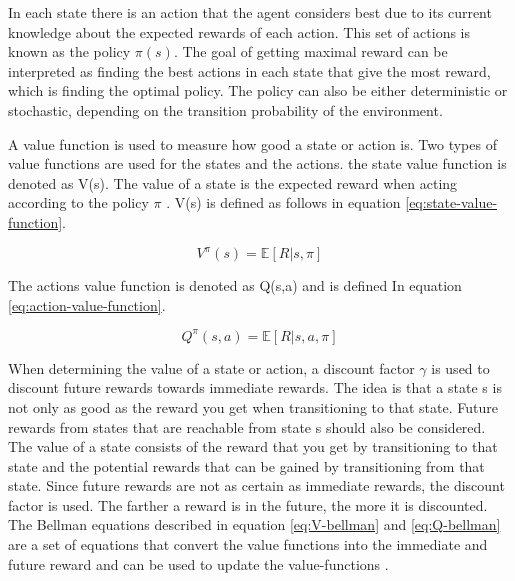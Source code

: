 \vspace{0.5cm}

In each state there is an action that the agent considers best due to its current knowledge about the expected rewards of each action. This set of actions is known as the policy 
$\pi (s)$. 
The goal of getting maximal reward can be interpreted as finding the best actions in each state that give the most reward, which is finding the optimal policy. The policy can also be either deterministic or stochastic, depending on the transition probability of the environment.

\vspace{0.5cm}

A value function is used to measure how good a state or action is. Two types of value functions are used for the states and the actions. the state value function is denoted as V(s). The value of a state is the expected reward when acting according to the policy 
$\pi$ \cite{rlwiki}.
V(s) is defined as follows in equation \ref{eq:state-value-function}.

\begin{equation}
\label{eq:state-value-function}
V^\pi (s) = \mathbb{E} [R | s,\pi]
\end{equation}

The actions value function is denoted as Q(s,a) and is defined In equation \ref{eq:action-value-function}.

\begin{equation}
\label{eq:action-value-function}
Q^\pi (s,a) = \mathbb{E} [R | s,a,\pi]
\end{equation}

When determining the value of a state or action, a discount factor $\gamma$
is used to discount future rewards towards immediate rewards. 
The idea is that a state s is not only as good as the reward you get when transitioning to that state. Future rewards from states that are reachable from state s should also be considered. The value of a state consists of the reward that you get by transitioning to that state and the potential rewards that can be gained by transitioning from that state. 
Since future rewards are not as certain as immediate rewards, the discount factor is used. The farther a reward is in the future, the more it is discounted. 
The Bellman equations described in equation \ref{eq:V-bellman} and \ref{eq:Q-bellman} are a set of equations that convert the value functions into the immediate and future reward and can be used to update the value-functions \cite{rllilianweng}.

